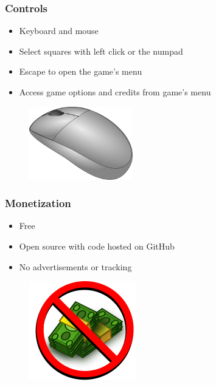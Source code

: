 \documentclass{beamer}
\begin{document}
\begin{frame}
  \frametitle{Controls}

  \begin{itemize}
    \item Keyboard and mouse
    \item Select squares with left click or the numpad
    \item Escape to open the game's menu
    \item Access game options and credits from game's menu
  \end{itemize}

  \begin{figure}
    \vspace{1em}
    \includegraphics[width=0.4\textwidth]{img/clip-art/computer-mouse}
  \end{figure}

\end{frame}


\begin{frame}
  \frametitle{Monetization}

  \begin{itemize}
    \item Free
    \item Open source with code hosted on GitHub
    \item No advertisements or tracking
  \end{itemize}

  \begin{figure}
    \vspace{1em}
    \includegraphics[height=0.40\textheight]{img/clip-art/no-money}
  \end{figure}

\end{frame}
\end{document}
